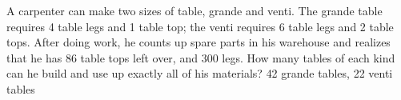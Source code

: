 {A carpenter can make two sizes of table, grande and venti. The grande table requires 4 table legs and 1 table top; the venti requires 6 table legs and 2 table tops. After doing work, he counts up spare parts in his warehouse and realizes that he has 86 table tops left over, and 300 legs. How many tables of each kind can he build and use up exactly all of his materials?}
{42 grande tables, 22 venti tables}